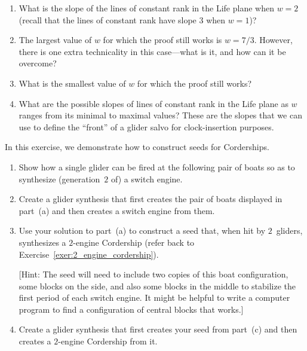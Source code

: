 \begin{multicols}{2}
\begin{problemstar}
\begin{enumerate}[label=\bf\color{ocre}(\alph*)]
			\item What is the slope of the lines of constant rank in the Life plane when $w = 2$ (recall that the lines of constant rank have slope $3$ when $w = 1$)?
			
			\item The largest value of $w$ for which the proof still works is $w = 7/3$. However, there is one extra technicality in this case---what is it, and how can it be overcome?
			
			\item What is the smallest value of $w$ for which the proof still works?
			
			
			\item What are the possible slopes of lines of constant rank in the Life plane as $w$ ranges from its minimal to maximal values? These are the slopes that we can use to define the ``front'' of a glider salvo for clock-insertion purposes.
		\end{enumerate}
	\end{problemstar}
	
	
	\mfilbreak
	
	
	\begin{problemstar}\label{exer:2_engine_corder_seed}
		In this exercise, we demonstrate how to construct seeds for Corderships.
		\begin{enumerate}[label=\bf\color{ocre}(\alph*)]
			\item Show how a single glider can be fired at the following pair of boats so as to synthesize (generation~$2$ of) a switch engine.
			\begin{center}
			\end{center}
			
			\item Create a glider synthesis that first creates the pair of boats displayed in part~(a) and then creates a switch engine from them.
			
			\item Use your solution to part~(a) to construct a seed that, when hit by $2$~gliders, synthesizes a $2$-engine Cordership (refer back to Exercise~\ref{exer:2_engine_cordership}).
			
			[Hint: The seed will need to include two copies of this boat configuration, some blocks on the side, and also some blocks in the middle to stabilize the first period of each switch engine. It might be helpful to write a computer program to find a configuration of central blocks that works.]
			
			\item Create a glider synthesis that first creates your seed from part~(c) and then creates a $2$-engine Cordership from it.
		\end{enumerate}
	\end{problemstar}
	
	
	
	
\end{multicols}
\normalsize\vspace*{0.01cm}
